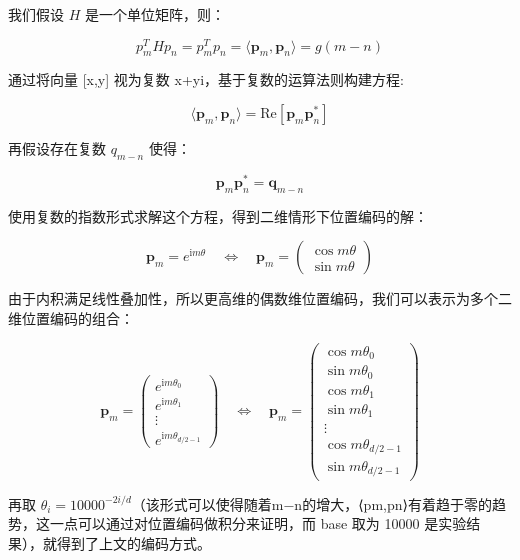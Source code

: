 \documentclass[12pt,a4paper]{book}
\begin{document}
我们假设 \(H\) 是一个单位矩阵，则：

\[
p_m^THp_n = p_m^Tp_n = \langle\boldsymbol{p}_m, \boldsymbol{p}_n\rangle = g(m-n)
\]

通过将向量 {[}x,y{]} 视为复数 x+yi，基于复数的运算法则构建方程:

\[
\begin{equation}\langle\boldsymbol{p}_m, \boldsymbol{p}_n\rangle = \text{Re}[\boldsymbol{p}_m \boldsymbol{p}_n^*]\end{equation}
\]

再假设存在复数 \(q_{m-n}\) 使得：

\[
\begin{equation}\boldsymbol{p}_m \boldsymbol{p}_n^* = \boldsymbol{q}_{m-n}\end{equation}
\]

使用复数的指数形式求解这个方程，得到二维情形下位置编码的解：

\[
\begin{equation}\boldsymbol{p}_m = e^{\text{i}m\theta}\quad\Leftrightarrow\quad \boldsymbol{p}_m=\begin{pmatrix}\cos m\theta \\ \sin m\theta\end{pmatrix}\end{equation}
\]

由于内积满足线性叠加性，所以更高维的偶数维位置编码，我们可以表示为多个二维位置编码的组合：

\[
\begin{equation}\boldsymbol{p}_m = \begin{pmatrix}e^{\text{i}m\theta_0} \\ e^{\text{i}m\theta_1} \\ \vdots \\ e^{\text{i}m\theta_{d/2-1}}\end{pmatrix}\quad\Leftrightarrow\quad \boldsymbol{p}_m=\begin{pmatrix}\cos m\theta_0 \\ \sin m\theta_0 \\ \cos m\theta_1 \\ \sin m\theta_1 \\ \vdots \\ \cos m\theta_{d/2-1} \\ \sin m\theta_{d/2-1}  \end{pmatrix}\end{equation}
\]

再取
\(\theta_i = 10000^{-2i/d}\)（该形式可以使得随着\textbar m−n\textbar 的增大，⟨pm,pn⟩有着趋于零的趋势，这一点可以通过对位置编码做积分来证明，而
base 取为 10000 是实验结果），就得到了上文的编码方式。
\end{document}
